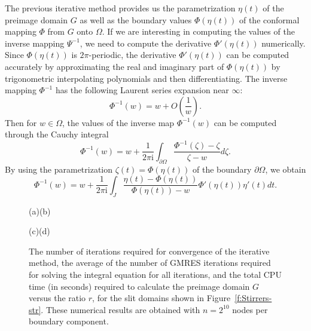 \documentclass[11pt,a4paper]{article}
\renewcommand{\i}{\mathrm{i}}
\renewcommand{\i}{\mathrm{i}}
\begin{document}
The previous iterative method provides us the parametrization $\eta(t)$ of the preimage domain $G$ as well as the boundary values $\Phi(\eta(t))$ of the conformal mapping $\Phi$ from $G$ onto $\Omega$. If we are interesting in computing the values of the inverse mapping $\Psi^{-1}$, we need to compute the derivative $\Phi'(\eta(t))$ numerically. Since $\Phi(\eta(t))$ is $2\pi$-periodic, the derivative $\Phi'(\eta(t))$ can be computed accurately by approximating the real and imaginary part of $\Phi(\eta(t))$ by trigonometric interpolating polynomials and then differentiating. 
The inverse mapping $\Phi^{-1}$ has the following Laurent series expansion near $\infty$:
\[
\Phi^{-1}(w)=w+O\left(\frac{1}{w}\right).
\]
Then for $w\in\Omega$, the values of the inverse map $\Phi^{-1}(w)$ can be computed through the Cauchy integral
\begin{equation}\label{eq:rec-Phi-1}
\Phi^{-1}(w)=w+\frac{1}{2\pi\i}\int_{\partial\Omega}\frac{\Phi^{-1}(\zeta)-\zeta}{\zeta-w}d\zeta.
\end{equation}
By using the parametrization $\zeta(t)=\Phi(\eta(t))$ of the boundary $\partial\Omega$, we obtain
\begin{equation}\label{eq:rec-Phi-2}
\Phi^{-1}(w)=w+\frac{1}{2\pi\i}\int_{J}\frac{\eta(t)-\Phi(\eta(t))}{\Phi(\eta(t))-w}\Phi'(\eta(t))\eta'(t)dt.
\end{equation}

\begin{figure}[ht] %
{\quad(a)\hfill\qquad\qquad\qquad\qquad(b)\hfill}

\centerline{
\hfill
{}
}
{\quad(c)\hfill\qquad\qquad\qquad\qquad(d)\hfill}

\centerline{
\hfill
{}
}
\caption{The number of iterations required for convergence of the iterative method, the average of the number of GMRES iterations required for solving the integral equation for all iterations, and the total CPU time (in seconds) required to calculate the preimage domain $G$ versus the ratio $r$, for the slit domains shown in Figure~\ref{f:Stirrers-str}. These numerical results are obtained with $n=2^{10}$ nodes per boundary component.} 
\label{f:itr-str}
\end{figure}
\end{document}
